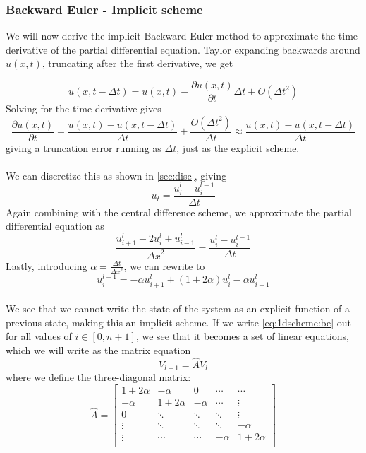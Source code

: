 \documentclass[10pt,a4paper]{article}
\newcommand{\dt}{{\Delta t}}
\newcommand{\dx}{{\Delta x}}
\newcommand{\pt}{{\partial t}}
\newcommand{\pu}{{\partial u}}
\begin{document}
\subsubsection{Backward Euler - Implicit scheme}\label{sec:method_be}
We will now derive the implicit Backward Euler method to approximate the time derivative of the partial differential equation. Taylor expanding backwards around $u(x,t)$, truncating after the first derivative, we get

\begin{equation}
u(x,t-\dt) = u(x,t) - \frac{\pu(x,t)}{\pt}\dt + O(\dt^2)
\end{equation}
Solving for the time derivative gives
\begin{equation}
\frac{\pu(x,t)}{\pt} = \frac{u(x,t) - u(x,t-\dt)}{\dt} + \frac{O(\dt^2)}{\dt} \approx \frac{u(x,t) - u(x,t-\dt)}{\dt}
\end{equation}
giving a truncation error running as $\dt$, just as the explicit scheme.
\\\\
We can discretize this as shown in \ref{sec:disc}, giving
\begin{equation}
u_t = \frac{u_i^l - u_i^{l-1}}{\dt}
\end{equation}
Again combining with the central difference scheme, we approximate the partial differential equation as
\begin{equation}
\frac{u_{i+1}^l - 2u_i^l+u_{i-1}^l}{\dx^2} = \frac{u_i^l - u_i^{l-1}}{\dt}
\end{equation}
Lastly, introducing $\alpha = \frac{\dt}{\dx^2}$, we can rewrite to
\begin{equation}\label{eq:1dscheme:be}
u_i^{l-1} = -\alpha u_{i+1}^l + (1 + 2\alpha )u_i^l - \alpha u_{i-1}^l
\end{equation}
\\
We see that we cannot write the state of the system as an explicit function of a previous state, making this an implicit scheme. If we write \ref{eq:1dscheme:be} out for all values of $i \in [0,n+1]$, we see that it becomes a set of linear equations, which we will write as the matrix equation
\begin{equation}\label{eq:be_matrix}
V_{l-1} = \hat{A}V_l
\end{equation}
where we define the three-diagonal matrix:
\begin{equation}
\hat{A} = \begin{bmatrix}
1+2\alpha & -\alpha & 0 & \cdots & \cdots \\
-\alpha & 1+2\alpha & -\alpha & \cdots & \vdots \\
0 & \ddots & \ddots & \ddots & \vdots \\
\vdots & \ddots & \ddots & \ddots & -\alpha \\
\vdots & \cdots & \cdots & -\alpha & 1+2\alpha \\
\end{bmatrix}
\end{equation}
\end{document}

